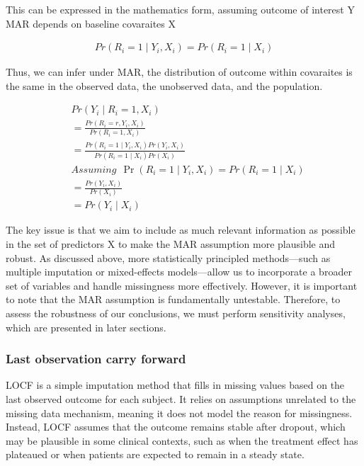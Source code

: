 \documentclass{article}
\begin{document}
This can be expressed in the mathematics form, assuming outcome of
interest Y MAR depends on baseline covaraites X

\begin{align*}
  Pr(R_i=1 \mid Y_i, X_i) = Pr(R_i=1 \mid X_i)
  \end{align*}

Thus, we can infer under MAR, the distribution of outcome within
covaraites is the same in the observed data, the unobserved data, and
the population.

\begin{align*}
  & Pr(Y_i \mid R_i=1, X_i) \\ 
  & = \displaystyle \frac{Pr(R_i=r,Y_i,X_i)}{Pr(R_i=1,X_i)} \\
  & = \displaystyle \frac{Pr(R_i=1 \mid Y_i,X_i)Pr(Y_i,X_i)}{Pr(R_i=1 \mid X_i)Pr(X_i)} 
  \\
  & Assuming \ \ \Pr(R_i=1 \mid Y_i, X_i) = Pr(R_i=1 \mid X_i) \\
  & = \displaystyle \frac{Pr(Y_i,X_i)}{Pr(X_i)} \\
  & = Pr(Y_i \mid X_i)
  \end{align*}

The key issue is that we aim to include as much relevant information as
possible in the set of predictors X to make the MAR assumption more
plausible and robust. As discussed above, more statistically principled
methods---such as multiple imputation or mixed-effects models---allow us
to incorporate a broader set of variables and handle missingness more
effectively. However, it is important to note that the MAR assumption is
fundamentally untestable. Therefore, to assess the robustness of our
conclusions, we must perform sensitivity analyses, which are presented
in later sections.

\subsubsection{Last observation carry
forward}\label{last-observation-carry-forward}

LOCF is a simple imputation method that fills in missing values based on
the last observed outcome for each subject. It relies on assumptions
unrelated to the missing data mechanism, meaning it does not model the
reason for missingness. Instead, LOCF assumes that the outcome remains
stable after dropout, which may be plausible in some clinical contexts,
such as when the treatment effect has plateaued or when patients are
expected to remain in a steady state.
\end{document}
